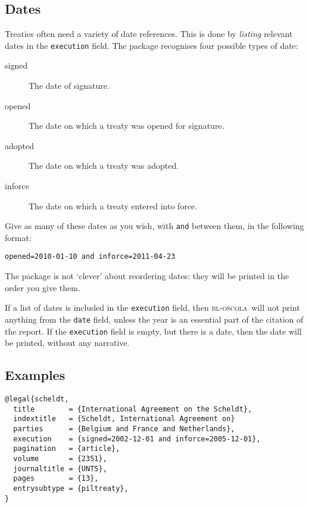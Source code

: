 \documentclass[a4paper,
               11pt,
	       DIV=1,			   
	       footinclude=false]
	      {scrartcl}
\newcommand{\oscola}{\textsc{bl-oscola}}
\newcounter{egcounter}\setcounter{egcounter}{0}
\newlength{\boxwidth}
\newenvironment{bibexample}[1][]
{%
  \medskip\par\noindent\ignorespaces
  \marginpar{[\refstepcounter{egcounter}\arabic{egcounter}]\label{#1}}%
  \setlength{\boxwidth}{0.95\linewidth}%
  \addtolength{\boxwidth}{-2\fboxsep}
  \addtolength{\boxwidth}{-2\fboxrule}
  \begin{lrbox}{\boxcontainer}
  \begin{minipage}[t]{\boxwidth}%
}
{%
  \end{minipage}\end{lrbox}%
  \colorbox{gray!30}{\usebox{\boxcontainer}}
  \par\medskip}
\begin{document}
\subsection{Dates}

Treaties often need a variety of date references. This is done by
\emph{listing} relevant dates in the \texttt{execution} field. The
package recognises four possible types of date: 
\begin{description}
\item[signed]
The date of signature.  
\item[opened] 
The date on which
a treaty was opened for signature.  
\item[adopted] 
The date on which a
treaty was adopted.  
\item[inforce]
The date on which a treaty entered
into force.  
\end{description} 
Give as many of these dates as you
wish, with \texttt{and} between them, in the following format:
\begin{center} \texttt{opened=2010-01-10 and inforce=2011-04-23}
\end{center}

The package is not `clever' about reordering dates: they will be
printed in the order you give them.

If a list of dates is included in the \texttt{execution} field, then
\oscola\ will not print anything from the \texttt{date} field, unless
the year is an essential part of the citation of the report. If the
\texttt{execution} field is empty, but there is a date, then the date
will be printed, without any narrative.

\subsection{Examples}

\begin{bibexample}[scheldt]
\begin{verbatim}
@legal{scheldt,
  title        = {International Agreement on the Scheldt},
  indextitle   = {Scheldt, International Agreement on}
  parties      = {Belgium and France and Netherlands},
  execution    = {signed=2002-12-01 and inforce=2005-12-01},
  pagination   = {article},
  volume       = {2351},
  journaltitle = {UNTS},
  pages        = {13},
  entrysubtype = {piltreaty},
}
\end{verbatim}
\end{bibexample}
\end{document}
